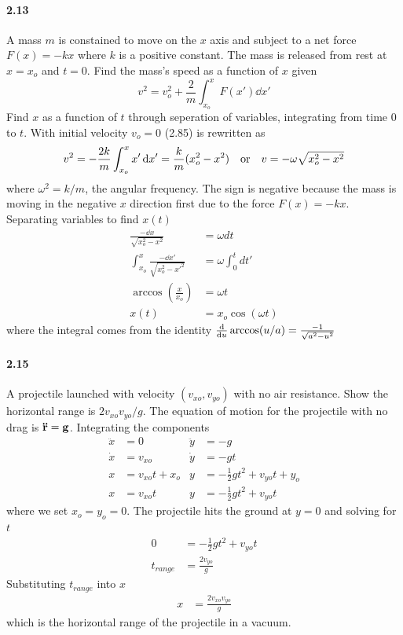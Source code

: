 \documentclass[../problems.tex]{subfiles}
\begin{document}
\paragraph{2.13} A mass $m$ is constained to move on the $x$ axis and subject to a net force
$F(x) = -kx$ where $k$ is a positive constant. The mass is released from rest at $x = x_o$ and
$t = 0$. Find the mass's speed as a function of $x$ given
\begin{equation*}
    \tag{2.85} \label{eq2.85}
    v^2 = v_o^2 + \frac{2}{m} \int_{x_o}^x F(x') \dd{x'}
\end{equation*}
Find $x$ as a function of $t$ through seperation of variables, integrating from time 0 to $t$.
\barh
With initial velocity $v_o = 0$ (2.85) is rewritten as
\begin{equation*}
    v^2 = -\frac{2k}{m} \int_{x_o}^x x'\dd{x'} = \frac{k}{m}(x_o^2 - x^2) 
    \qor v = -\omega \sqrt{x_o^2 - x^2}
\end{equation*}
where $\omega^2 = k/m$, the angular frequency. The sign is negative because the mass is moving in
the negative $x$ direction first due to the force $F(x) = -kx$. Separating variables to find $x(t)$
\begin{align*}
    \frac{-\dd{x}}{\sqrt{x_o^2 - x^2}} &= \omega dt \\
    \int_{x_o}^x \frac{-\dd{x'}}{\sqrt{x_o^2 - x'^2}} &= \omega \int_0^t dt' \\
    \arccos(\frac{x}{x_o}) &= \omega t \\
    x(t) &= x_o \cos(\omega t)
\end{align*}
where the integral comes from the identity ${\dv{u}\arccos(u/a) = \frac{-1}{\sqrt{a^2-u^2}}}$

\paragraph{2.15} A projectile launched with velocity $(v_{xo}, v_{yo})$ with no air resistance.
Show the horizontal range is $2v_{xo}v_{yo}/g$.
\barh 
The equation of motion for the projectile with no drag is $\vb{\ddot r} = \vb g$. Integrating the 
components
\begin{align*}
    \ddot{x} &= 0       & \ddot y &= -g\\ 
    \dot{x} &= v_{xo}   & \dot y &= -gt\\
    x &= v_{xo} t + x_o & y &= -\frac{1}{2}gt^2 + v_{yo}t + y_o \\
    x &= v_{xo} t       & y &= -\frac{1}{2}gt^2 + v_{yo}t
\end{align*}
where we set $x_o = y_o = 0$. The projectile hits the ground at $y = 0$ and solving for $t$
\begin{align*}
    0 &= -\frac{1}{2}gt^2 + v_{yo}t \\
    t_{range} &= \frac{2v_{yo}}{g}
\end{align*}
Substituting $t_{range}$ into $x$
\begin{align*}
    x &= \frac{2v_{xo}v_{yo}}{g}
\end{align*}
which is the horizontal range of the projectile in a vacuum.
\end{document}
